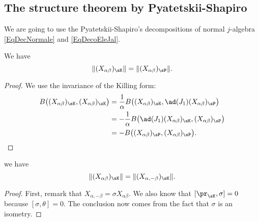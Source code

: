 \subsection{The structure theorem by Pyatetskii-Shapiro}

We are going to use the  Pyatetskii-Shapiro's decompositions of normal $j$-algebra \eqref{EqDecNormale} and \eqref{EqDecoEleJal}.

\begin{lemma}
	We have
	\begin{equation}
		\| (X_{\alpha\beta})_{\sK} \|=\| (X_{\alpha\beta})_{\sP} \|.
	\end{equation}
\end{lemma}

\begin{proof}
	We use the invariance of the Killing form:
	\begin{equation}
		\begin{aligned}[]
			B\big( (X_{\alpha\beta})_{\sK},(X_{\alpha\beta})_{\sK} \big)&=\frac{1}{ \alpha }B\big( (X_{\alpha\beta})_{\sK},\ad(J_1)(X_{\alpha\beta})_{\sP} \big)\\
			&=-\frac{1}{ \alpha }B\big( \ad(J_1)(X_{\alpha\beta})_{\sK},(X_{\alpha\beta})_{\sP} \big)\\
				&=-B\big( (X_{\alpha\beta})_{\sP},(X_{\alpha\beta})_{\sP} \big).
		\end{aligned}
	\end{equation}
\end{proof}

\begin{lemma}
	we have
	\begin{equation}
		\| (X_{\alpha\beta})_{\sK} \|=\| (X_{\alpha,-\beta})_{\sK} \|.
	\end{equation}
\end{lemma}

\begin{proof}
	First, remark that $X_{\alpha,-\beta}=\sigma X_{\alpha\beta}$. We also know that $[\pr_{\sK},\sigma]=0$ because $[\sigma,\theta]=0$. The conclusion now comes from the fact that $\sigma$ is an isometry.
\end{proof}

